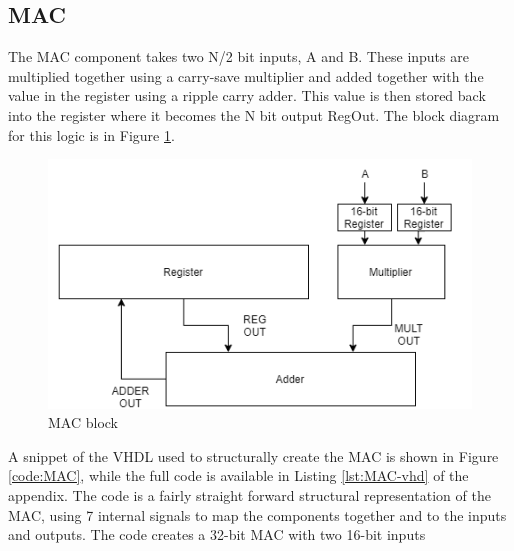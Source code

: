 \documentclass[11pt]{article}
\begin{document}
	\subsection{MAC}
		The MAC component takes two N/2 bit inputs, A and B. These inputs are multiplied together using a carry-save multiplier and added together with the value in the register using a ripple carry adder. This value is then stored back into the register where it becomes the N bit output RegOut. The block diagram for this logic is in Figure \ref{fig:MAC-block}.
	
		\begin{figure}[H] 
			\centering 
			\includegraphics[width=\textwidth,height=\dimexpr\textheight-4\baselineskip-\abovecaptionskip-\belowcaptionskip\relax,keepaspectratio]{"Pictures/MAC-block"}
			\caption{MAC block} 
			\label{fig:MAC-block} 
		\end{figure}
		
		A snippet of the VHDL used to structurally create the MAC is shown in Figure \ref{code:MAC}, while the full code is available in Listing \ref{lst:MAC-vhd} of the appendix. The code is a fairly straight forward structural representation of the MAC, using 7 internal signals to map the components together and to the inputs and outputs. The code creates a 32-bit MAC with two 16-bit inputs
		
\end{document}
